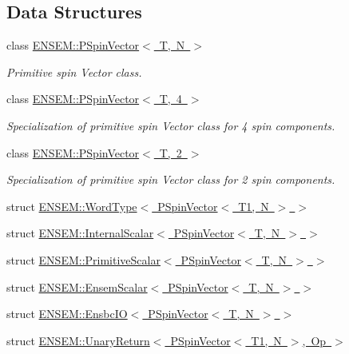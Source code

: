 \subsection*{Data Structures}
\begin{DoxyCompactItemize}
\item 
class \mbox{\hyperlink{classENSEM_1_1PSpinVector}{E\+N\+S\+E\+M\+::\+P\+Spin\+Vector$<$ T, N $>$}}
\begin{DoxyCompactList}\small\item\em Primitive spin Vector class. \end{DoxyCompactList}\item 
class \mbox{\hyperlink{classENSEM_1_1PSpinVector_3_01T_00_014_01_4}{E\+N\+S\+E\+M\+::\+P\+Spin\+Vector$<$ T, 4 $>$}}
\begin{DoxyCompactList}\small\item\em Specialization of primitive spin Vector class for 4 spin components. \end{DoxyCompactList}\item 
class \mbox{\hyperlink{classENSEM_1_1PSpinVector_3_01T_00_012_01_4}{E\+N\+S\+E\+M\+::\+P\+Spin\+Vector$<$ T, 2 $>$}}
\begin{DoxyCompactList}\small\item\em Specialization of primitive spin Vector class for 2 spin components. \end{DoxyCompactList}\item 
struct \mbox{\hyperlink{structENSEM_1_1WordType_3_01PSpinVector_3_01T1_00_01N_01_4_01_4}{E\+N\+S\+E\+M\+::\+Word\+Type$<$ P\+Spin\+Vector$<$ T1, N $>$ $>$}}
\item 
struct \mbox{\hyperlink{structENSEM_1_1InternalScalar_3_01PSpinVector_3_01T_00_01N_01_4_01_4}{E\+N\+S\+E\+M\+::\+Internal\+Scalar$<$ P\+Spin\+Vector$<$ T, N $>$ $>$}}
\item 
struct \mbox{\hyperlink{structENSEM_1_1PrimitiveScalar_3_01PSpinVector_3_01T_00_01N_01_4_01_4}{E\+N\+S\+E\+M\+::\+Primitive\+Scalar$<$ P\+Spin\+Vector$<$ T, N $>$ $>$}}
\item 
struct \mbox{\hyperlink{structENSEM_1_1EnsemScalar_3_01PSpinVector_3_01T_00_01N_01_4_01_4}{E\+N\+S\+E\+M\+::\+Ensem\+Scalar$<$ P\+Spin\+Vector$<$ T, N $>$ $>$}}
\item 
struct \mbox{\hyperlink{structENSEM_1_1EnsbcIO_3_01PSpinVector_3_01T_00_01N_01_4_01_4}{E\+N\+S\+E\+M\+::\+Ensbc\+I\+O$<$ P\+Spin\+Vector$<$ T, N $>$ $>$}}
\item 
struct \mbox{\hyperlink{structENSEM_1_1UnaryReturn_3_01PSpinVector_3_01T1_00_01N_01_4_00_01Op_01_4}{E\+N\+S\+E\+M\+::\+Unary\+Return$<$ P\+Spin\+Vector$<$ T1, N $>$, Op $>$}}

\end{DoxyCompactItemize}
